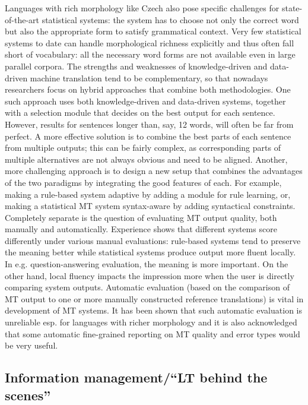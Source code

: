 \begin{multicols}{2}
Languages with rich morphology like Czech also pose specific challenges for state-of-the-art statistical systems: the system has to choose not only the correct word but also the appropriate form to satisfy grammatical context. Very few statistical systems to date can handle morphological richness explicitly and thus often fall short of vocabulary: all the necessary word forms are not available even in large parallel corpora.
The strengths and weaknesses of knowledge-driven and data-driven machine translation tend to be complementary, so that nowadays researchers focus on hybrid approaches that combine both methodologies. One such approach uses both knowledge-driven and data-driven systems, together with a selection module that decides on the best output for each sentence. However, results for sentences longer than, say, 12 words, will often be far from perfect. A more effective solution is to combine the best parts of each sentence from multiple outputs; this can be fairly complex, as corresponding parts of multiple alternatives are not always obvious and need to be aligned. Another, more challenging approach is to design a new setup that combines the advantages of the two paradigms by integrating the good features of each. For example, making a rule-based system adaptive by adding a module for rule learning, or, making a statistical MT system syntax-aware by adding syntactical constraints.\\
Completely separate is the question of evaluating MT output quality, both manually and automatically. Experience shows that different systems score differently under various manual evaluations: rule-based systems tend to preserve the meaning better while statistical systems produce output more fluent locally. In e.g. question-answering evaluation, the meaning is more important. On the other hand, local fluency impacts the impression more when the user is directly comparing system outputs. Automatic evaluation (based on the comparison of MT output to one or more manually constructed reference translations) is vital in development of MT systems. It has been shown that such automatic evaluation is unreliable esp. for languages with richer morphology and it is also acknowledged that some automatic fine-grained reporting on MT quality and error types would be very useful.

\subsection{Information management/``LT behind the scenes''}


\end{multicols}
